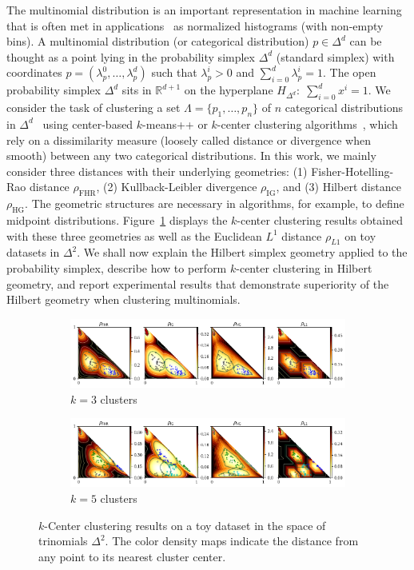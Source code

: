 \documentclass[graybox]{svmult}
\def\bbR{\mathbb{R}}
\def\FHR{\mathrm{FHR}}
\def\IG{\mathrm{IG}}
\def\HG{\mathrm{HG}}
\begin{document}
The multinomial distribution is an important representation in machine learning that is often met
in applications~\cite{MetricLearning-2002, ClusteringSimplex-2008} as normalized histograms (with non-empty bins). 
A multinomial distribution (or categorical distribution) $p\in\Delta^d$ can be thought as a point lying in the probability simplex $\Delta^d$ (standard simplex) with coordinates $p=(\lambda_p^0,\ldots,\lambda_p^d)$ such that $\lambda_p^i>0$ and $\sum_{i=0}^d \lambda_p^i=1$.
The open probability simplex $\Delta^d$ sits in $\bbR^{d+1}$ on the hyperplane $H_{\Delta^d}:\;\sum_{i=0}^d x^i =1$.
We consider the task of clustering a set $\Lambda=\{p_1,\ldots,p_n\}$ of $n$ categorical distributions
in $\Delta^d$~\cite{ClusteringSimplex-2008}
using center-based $k$-means++ or $k$-center clustering algorithms~\cite{kmeanspp-2007,kcenter-1985},
which rely on a dissimilarity measure (loosely called distance or divergence when smooth) between any two categorical distributions. 
In this work, we mainly consider three distances with their underlying geometries:
(1) Fisher-Hotelling-Rao distance $\rho_\FHR$, (2) Kullback-Leibler divergence $\rho_\IG$, and (3) Hilbert distance $\rho_\HG$.
The geometric structures are necessary in algorithms, for example, to define midpoint distributions.
Figure~\ref{fig:results} displays the $k$-center clustering results obtained with these three geometries
as well as the Euclidean $L^1$ distance $\rho_{L1}$ on toy datasets in $\Delta^2$.
We shall now explain the Hilbert simplex geometry applied to the probability simplex, describe
how to perform $k$-center clustering in Hilbert geometry, and report experimental results that
demonstrate superiority of the Hilbert geometry when clustering multinomials.

\begin{figure}[!t]
\centering
\begin{subfigure}{\textwidth}
\includegraphics[width=\textwidth]{kcenters3}
\caption{$k=3$ clusters}
\end{subfigure}
\begin{subfigure}{\textwidth}
\includegraphics[width=\textwidth]{kcenters5}
\caption{$k=5$ clusters}
\end{subfigure}
\caption{$k$-Center clustering results on a toy dataset in the space of trinomials $\Delta^2$.
The color density maps indicate the distance from any point to its nearest cluster center.}\label{fig:results}
\end{figure}
\end{document}
